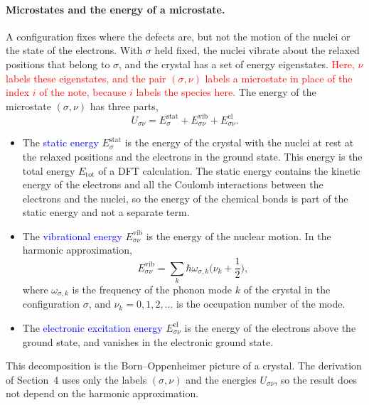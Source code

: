 \documentclass[11pt]{article}      %
\numberwithin{equation}{section}   %
\begin{document}
\paragraph{Microstates and the energy of a microstate.}
A configuration fixes where the defects are, but not the motion of the
nuclei or the state of the electrons. With $\sigma$ held fixed, the nuclei
vibrate about the relaxed positions that belong to $\sigma$, and the crystal
has a set of energy eigenstates. \textcolor{red}{Here, $\nu$ labels these
eigenstates, and the pair $(\sigma,\nu)$ labels a microstate in place of the
index $i$ of the note, because $i$ labels the species here.} The energy of
the microstate $(\sigma,\nu)$ has three parts,
\begin{equation}
    \boxed{U_{\sigma\nu}=E^{\text{stat}}_{\sigma}
    +E^{\text{vib}}_{\sigma\nu}+E^{\text{el}}_{\sigma\nu}.}
    \label{eq:energy}
\end{equation}
\begin{itemize}
    \item The \textcolor{blue}{static energy} $E^{\text{stat}}_{\sigma}$ is
    the energy of the crystal with the nuclei at rest at the relaxed
    positions and the electrons in the ground state. This energy is the
    total energy $E_{\text{tot}}$ of a DFT calculation. The static energy
    contains the kinetic energy of the electrons and all the Coulomb
    interactions between the electrons and the nuclei, so the energy of the
    chemical bonds is part of the static energy and not a separate term.
    \item The \textcolor{blue}{vibrational energy}
    $E^{\text{vib}}_{\sigma\nu}$ is the energy of the nuclear motion. In the
    harmonic approximation,
    \begin{equation*}
        E^{\text{vib}}_{\sigma\nu}
        =\sum_k\hbar\omega_{\sigma,k}\Big(\nu_k+\frac12\Big),
    \end{equation*}
    where $\omega_{\sigma,k}$ is the frequency of the phonon mode $k$ of the
    crystal in the configuration $\sigma$, and $\nu_k=0,1,2,\dots$ is the
    occupation number of the mode.
    \item The \textcolor{blue}{electronic excitation energy}
    $E^{\text{el}}_{\sigma\nu}$ is the energy of the electrons above the
    ground state, and vanishes in the electronic ground state.
\end{itemize}
This decomposition is the Born--Oppenheimer picture of a crystal. The
derivation of Section~4 uses only the labels $(\sigma,\nu)$ and the energies
$U_{\sigma\nu}$, so the result does not depend on the harmonic
approximation.
\end{document}
